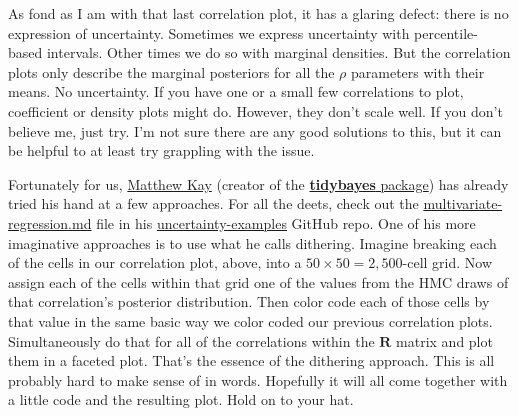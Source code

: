 \documentclass[]{article}
\begin{document}
As fond as I am with that last correlation plot, it has a glaring
defect: there is no expression of uncertainty. Sometimes we express
uncertainty with percentile-based intervals. Other times we do so with
marginal densities. But the correlation plots only describe the marginal
posteriors for all the \(\rho\) parameters with their means. No
uncertainty. If you have one or a small few correlations to plot,
coefficient or density plots might do. However, they don't scale well.
If you don't believe me, just try. I'm not sure there are any good
solutions to this, but it can be helpful to at least try grappling with
the issue.

Fortunately for us, \href{https://twitter.com/mjskay}{Matthew Kay}
(creator of the
\href{http://mjskay.github.io/tidybayes}{\textbf{tidybayes} package})
has already tried his hand at a few approaches. For all the deets, check
out the
\href{https://github.com/mjskay/uncertainty-examples/blob/master/multivariate-regression.md}{multivariate-regression.md}
file in his
\href{https://github.com/mjskay/uncertainty-examples}{uncertainty-examples}
GitHub repo. One of his more imaginative approaches is to use what he
calls dithering. Imagine breaking each of the cells in our correlation
plot, above, into a \(50 \times 50 = 2,500\)-cell grid. Now assign each
of the cells within that grid one of the values from the HMC draws of
that correlation's posterior distribution. Then color code each of those
cells by that value in the same basic way we color coded our previous
correlation plots. Simultaneously do that for all of the correlations
within the \(\mathbf R\) matrix and plot them in a faceted plot. That's
the essence of the dithering approach. This is all probably hard to make
sense of in words. Hopefully it will all come together with a little
code and the resulting plot. Hold on to your hat.
\end{document}
